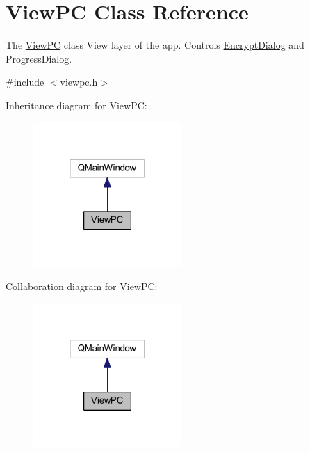 \hypertarget{class_view_p_c}{}\section{View\+PC Class Reference}
\label{class_view_p_c}


The \mbox{\hyperlink{class_view_p_c}{View\+PC}} class View layer of the app. Controls \mbox{\hyperlink{class_encrypt_dialog}{Encrypt\+Dialog}} and Progress\+Dialog.  




{\ttfamily \#include $<$viewpc.\+h$>$}



Inheritance diagram for View\+PC\+:
\nopagebreak
\begin{figure}[H]
\begin{center}
\leavevmode
\includegraphics[width=160pt]{class_view_p_c__inherit__graph}
\end{center}
\end{figure}


Collaboration diagram for View\+PC\+:
\nopagebreak
\begin{figure}[H]
\begin{center}
\leavevmode
\includegraphics[width=160pt]{class_view_p_c__coll__graph}
\end{center}
\end{figure}
